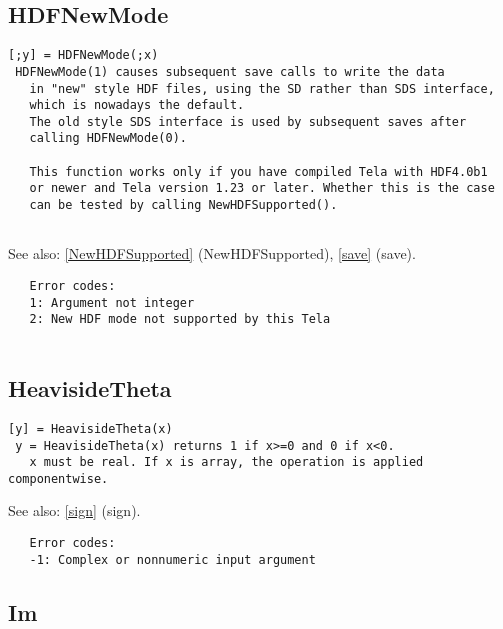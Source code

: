 \documentclass[a4paper]{article}
\begin{document}
\subsection{HDFNewMode\label{HDFNewMode}}

\begin{tscreen}
\begin{verbatim}
[;y] = HDFNewMode(;x)
 HDFNewMode(1) causes subsequent save calls to write the data
   in "new" style HDF files, using the SD rather than SDS interface,
   which is nowadays the default.
   The old style SDS interface is used by subsequent saves after
   calling HDFNewMode(0).
   
   This function works only if you have compiled Tela with HDF4.0b1
   or newer and Tela version 1.23 or later. Whether this is the case
   can be tested by calling NewHDFSupported().
   
\end{verbatim}

See also: \ref{NewHDFSupported} {(NewHDFSupported)}, \ref{save} {(save)}.
\begin{verbatim}
   Error codes:
   1: Argument not integer
   2: New HDF mode not supported by this Tela
   
\end{verbatim}
\end{tscreen}





\subsection{HeavisideTheta\label{HeavisideTheta}}

\begin{tscreen}
\begin{verbatim}
[y] = HeavisideTheta(x)
 y = HeavisideTheta(x) returns 1 if x>=0 and 0 if x<0.
   x must be real. If x is array, the operation is applied componentwise.
\end{verbatim}

See also: \ref{sign} {(sign)}.
\begin{verbatim}
   Error codes:
   -1: Complex or nonnumeric input argument 
\end{verbatim}
\end{tscreen}





\subsection{Im\label{Im}}
\end{document}
